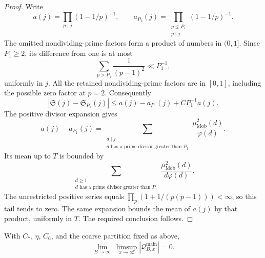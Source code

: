 \begin{proof}
Write
\[
 a(j)=\prod_{p\mid j}(1-1/p)^{-1},\qquad
 a_{P_1}(j)=\prod_{\substack{p\le P_1\\p\mid j}}(1-1/p)^{-1}.
\]
The omitted nondividing-prime factors form a product of numbers in
$(0,1]$.  Since $P_1\ge2$, its difference from one is at most
\[
 \sum_{p>P_1}\frac1{(p-1)^2}\ll P_1^{-1},
\]
uniformly in $j$.  All the retained nondividing-prime factors are in
$[0,1]$, including the possible zero factor at $p=2$.  Consequently
\[
 |\mathfrak S(j)-\mathfrak S_{P_1}(j)|
 \le a(j)-a_{P_1}(j)+C P_1^{-1}a(j).
\]
The positive divisor expansion gives
\[
 a(j)-a_{P_1}(j)
  =\sum_{\substack{d\mid j\\
                   d\text{ has a prime divisor greater than }P_1}}
      \frac{\mu_{\mathrm{Mob}}^2(d)}{\varphi(d)}.
\]
Its mean up to $T$ is bounded by
\[
 \sum_{\substack{d\ge1\\
                   d\text{ has a prime divisor greater than }P_1}}
     \frac{\mu_{\mathrm{Mob}}^2(d)}{d\varphi(d)}.
\]
The unrestricted positive series equals
$\prod_p(1+1/(p(p-1)))<\infty$, so this tail tends to zero.
The same expansion bounds the mean of $a(j)$ by that product,
uniformly in $T$.  The required conclusion follows.
\end{proof}

\begin{proposition}
\label{prop:conclusion-main-vanishes}
With $C_*$, $\eta$, $C_6$, and the coarse partition fixed as above,
\[
 \lim_{B\to\infty}\ \limsup_{x\to\infty}
                   |\mathcal Q^{\mathrm{main}}_{B,x}|=0.
\]
\end{proposition}

